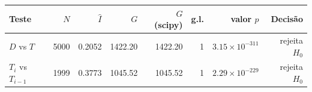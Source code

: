 \begin{tabular}{lrrrrrrr}
\toprule
Teste & $N$ & $\hat I$ & $G$ & $G$ (scipy) & g.l. & valor $p$ & Decisão \\
\midrule
$D$ vs $T$ & 5000 & 0.2052 & 1422.20 & 1422.20 & 1 & $3.15\times 10^{-311}$ & rejeita $H_0$ \\
$T_i$ vs $T_{i-1}$ & 1999 & 0.3773 & 1045.52 & 1045.52 & 1 & $2.29\times 10^{-229}$ & rejeita $H_0$ \\
\bottomrule
\end{tabular}
